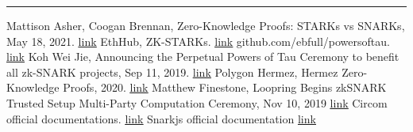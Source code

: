 \documentclass[letterpaper, 10 pt, conference]{ieeeconf}  %
\begin{document}
\noindent\rule{8cm}{0.4pt}
\begin{thebibliography}{99}

 Mattison Asher, Coogan Brennan, Zero-Knowledge Proofs: STARKs vs SNARKs, May 18, 2021. \href{https://consensys.net/blog/blockchain-explained/zero-knowledge-proofs-starks-vs-snarks/}{\underline{link}}
 EthHub, ZK-STARKs. \href{https://docs.ethhub.io/ethereum-roadmap/layer-2-scaling/zk-starks/}{\underline{link}}
 github.com/ebfull/powersoftau. \href{https://github.com/ebfull/powersoftau}{\underline{link}}
 Koh Wei Jie, Announcing the Perpetual Powers of Tau Ceremony to benefit all zk-SNARK projects, Sep 11, 2019. \href{https://medium.com/coinmonks/announcing-the-perpetual-powers-of-tau-ceremony-to-benefit-all-zk-snark-projects-c3da86af8377#:~:text=The%20Powers%20of%20Tau%20ceremony,protocol%20can%20be%20publicly%20verified.&text=Nevertheless%2C%20each%20ceremony%20takes%20time%20and%20is%20tedious%20to%20coordinate.}{\underline{link}}
 Polygon Hermez, Hermez Zero-Knowledge Proofs, 2020. \href{https://blog.hermez.io/hermez-zero-knowledge-proofs/}{\underline{link}}
 Matthew Finestone, Loopring Begins zkSNARK Trusted Setup Multi-Party Computation Ceremony, Nov 10, 2019 \href{https://medium.com/coinmonks/loopring-starts-zksnark-trusted-setup-multi-party-computation-ceremony-cd1b98113773#:~:text=There%20are%20two%20phases%20for,circuit%20in%20the%20Loopring%20protocol.}{\underline{link}}
 Circom official documentations. \href{https://docs.circom.io/circom-language/constraint-generation/}{\underline{link}}
 Snarkjs official documentation \href{https://github.com/iden3/snarkjs/blob/master/README.md}{\underline{link}}
\end{thebibliography}
\end{document}
